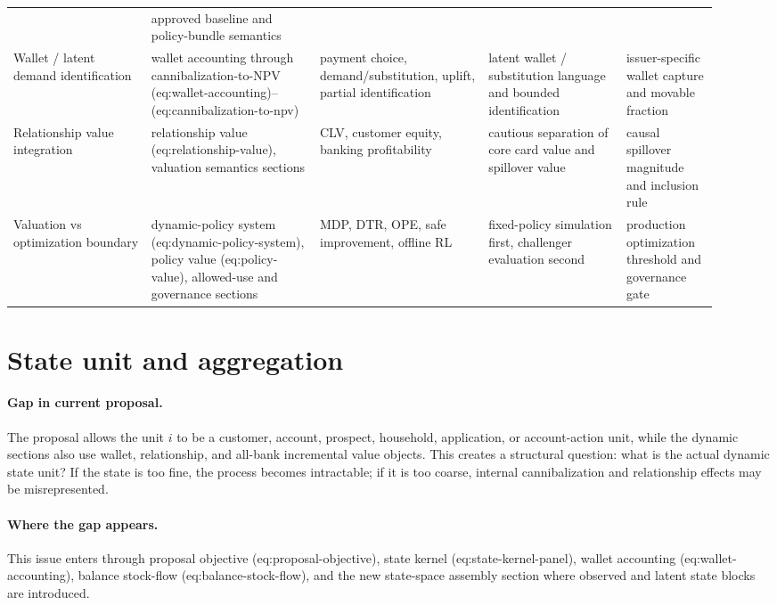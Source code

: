 \documentclass[11pt]{article}
\begin{document}
\begin{longtable}{L{0.18\linewidth}L{0.22\linewidth}L{0.22\linewidth}L{0.18\linewidth}L{0.12\linewidth}}
  & approved baseline and policy-bundle semantics \\
Wallet / latent demand identification
  & wallet accounting through cannibalization-to-NPV (eq:wallet-accounting)--(eq:cannibalization-to-npv)
  & payment choice, demand/substitution, uplift, partial identification
  & latent wallet / substitution language and bounded identification
  & issuer-specific wallet capture and movable fraction \\
Relationship value integration
  & relationship value (eq:relationship-value), valuation semantics sections
  & CLV, customer equity, banking profitability
  & cautious separation of core card value and spillover value
  & causal spillover magnitude and inclusion rule \\
Valuation vs optimization boundary
  & dynamic-policy system (eq:dynamic-policy-system), policy value (eq:policy-value), allowed-use and governance sections
  & MDP, DTR, OPE, safe improvement, offline RL
  & fixed-policy simulation first, challenger evaluation second
  & production optimization threshold and governance gate \\
\bottomrule
\end{longtable}

\section{State unit and aggregation}

\paragraph{Gap in current proposal.}
The proposal allows the unit $i$ to be a customer, account, prospect,
household, application, or account-action unit, while the dynamic sections also
use wallet, relationship, and all-bank incremental value objects. This creates a
structural question: what is the actual dynamic state unit? If the state is too
fine, the process becomes intractable; if it is too coarse, internal
cannibalization and relationship effects may be misrepresented.

\paragraph{Where the gap appears.}
This issue enters through proposal objective (eq:proposal-objective),
state kernel (eq:state-kernel-panel), wallet accounting (eq:wallet-accounting),
balance stock-flow (eq:balance-stock-flow), and the new state-space assembly
section where observed and latent state blocks are introduced.
\end{document}
